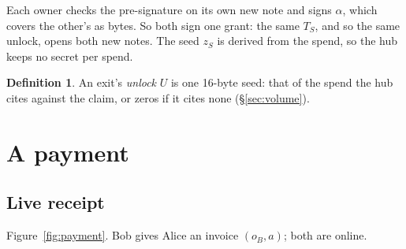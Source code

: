 \documentclass[11pt]{article}
\theoremstyle{plain}
\theoremstyle{definition}
\newtheorem{definition}{Definition}
\begin{document}
Each owner checks the pre-signature on its own new note and signs
$\alpha$, which covers the other's as bytes. So both sign one grant:
the same $T_S$, and so the same unlock, opens both new notes. The seed
$z_S$ is derived from the spend, so the hub keeps no secret per spend.

\begin{definition}
An exit's \emph{unlock} $U$ is one 16-byte seed: that of the spend the
hub cites against the claim, or zeros if it cites none
(\S\ref{sec:volume}).
\end{definition}

\section{A payment}\label{sec:payment}

\subsection{Live receipt}\label{sec:live}

Figure~\ref{fig:payment}. Bob gives Alice an invoice $(o_B, a)$; both
are online.
\end{document}
